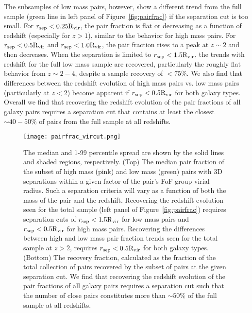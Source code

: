 \documentclass[twocolumn]{aastex631}
\newcommand{\Rvir}{\ensuremath{\rm R_{vir}}}
\begin{document}
    The subsamples of low mass pairs, however, show a different trend from the full sample (green line in left panel of Figure~\ref{fig:pairfrac}) if the separation cut is too small. 
    For $r_{\mathrm{sep}} < 0.25\Rvir$, the pair fraction is flat or decreasing as a function of redshift (especially for $z>1$), similar to the behavior for high mass pairs. 
    For $r_{\mathrm{sep}} < 0.5\Rvir$ and $r_{\mathrm{sep}} < 1.0\Rvir$, the pair fraction rises to a peak at $z\sim2$ and then decreases. 
    When the separation is limited to $r_{\mathrm{sep}} < 1.5\Rvir$, the trends with redshift for the full low mass sample are recovered, particularly the roughly flat behavior from $z\sim2-4$, despite a sample recovery of $<75\%$. 
    We also find that differences between the redshift evolution of high mass pairs vs. low mass pairs (particularly at $z<2$) become apparent if $r_{\mathrm{sep}} < 0.5\Rvir$ for both galaxy types. 
    Overall we find that recovering the redshift evolution of the pair fractions of all galaxy pairs requires a separation cut that contains at least the closest $\sim40-50\%$ of pairs from the full sample at all redshifts. 

    \begin{figure*}[htp]
        \centering
        \texttt{[image: pairfrac\_vircut.png]}
        \caption{\label{fig:vircut}The median and 1-99 percentile spread are shown by the solid lines and shaded regions, respectively. 
        (Top) The median pair fraction of the subset of high mass (pink) and low mass (green) pairs with 3D separations within a given factor of the pair's FoF group virial radius.
        Such a separation criteria will vary as a function of both the mass of the pair and the redshift. 
        Recovering the redshift evolution seen for the total sample (left panel of Figure~\ref{fig:pairfrac}) requires separation cuts of $r_{\mathrm{sep}} < 1.5\Rvir$ for low mass pairs and $r_{\mathrm{sep}} < 0.5\Rvir$ for high mass pairs. 
        Recovering the differences between high and low mass pair fraction trends seen for the total sample at $z>2$, requires $r_{\mathrm{sep}} < 0.5\Rvir$ for both galaxy types. 
        (Bottom) The recovery fraction, calculated as the fraction of the total collection of pairs recovered by the subset of pairs at the given separation cut. 
        We find that recovering the redshift evolution of the pair fractions of all galaxy pairs requires a separation cut such that the number of close pairs constitutes more than $\sim50\%$ of the full sample at all redshifts.
    }
    \end{figure*}
\end{document}

